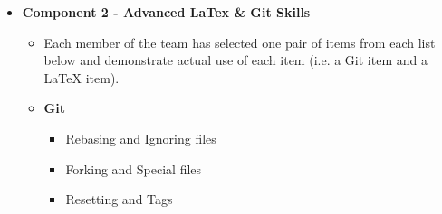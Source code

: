 \documentclass[a4paper, 11pt]{report}
\begin{document}
{\begin{itemize}
	\begin{itemize}
	\item Identified two tools that are widely used in industry, and which relate to the major chosen for this project.
		\begin{itemize}
		\item The two tools selected are not the same as the tools selected by other students in the tutorial. 
		\item The two tools selected are relevant to the major chosen.
		\end{itemize}
	\item Answer the following questions as instructed in 'Part A' \& 'Part B':
		\begin{itemize}
		\item What are the two tools you have identified for your chosen major
		\item 3 main functionality of each of the identified tools
		\item The ways in which those tools are used in the industry of your chosen major;
		\item 2 weaknesses or limitations of each of the tools
		\end{itemize}
	\item \textbf{Part A}: Generate a set of questions (minimum 5 questions) that can be put to ChatGPT in order to obtain answers to each of the above four questions. Using ChatGPT, then generate the answers for each of the two tools. You must include in the report below both the questions that you posed to ChatGPT, and the answers that it provided. (100 - 250 words for each question)
	\item \textbf{Part B}: For each of the four answers from Part A, assess the answer that ChatGPT provided and explain to us why they agree or disagree with the answer (100 words for each question above).
	\end{itemize}
\item \textbf{Component 2 - Advanced LaTex \& Git Skills}
	\begin{itemize}
	\item Each member of the team has selected one pair of items from each list below and demonstrate actual use of each item (i.e. a Git item and a LaTeX item).
	\item \textbf{Git}
		\begin{itemize}
		\item Rebasing and Ignoring files
		\item Forking and Special files
		\item Resetting and Tags

\end{itemize}
\end{itemize}
\end{itemize}}
\end{document}
